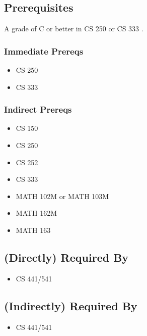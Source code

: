 \documentclass[]{article}
\providecommand{\tightlist}{%
  \setlength{\itemsep}{0pt}\setlength{\parskip}{0pt}}
\begin{document}
\subsection{Prerequisites}\label{prerequisites-23}

A grade of C or better in CS 250 or CS 333 .

\subsubsection{Immediate Prereqs}\label{immediate-prereqs-16}

\begin{itemize}
\tightlist
\item
  CS 250
\item
  CS 333
\end{itemize}

\subsubsection{Indirect Prereqs}\label{indirect-prereqs-16}

\begin{itemize}
\tightlist
\item
  CS 150
\item
  CS 250
\item
  CS 252
\item
  CS 333
\item
  MATH 102M or MATH 103M
\item
  MATH 162M
\item
  MATH 163
\end{itemize}

\subsection{(Directly) Required By}\label{directly-required-by-12}

\begin{itemize}
\tightlist
\item
  CS 441/541
\end{itemize}

\subsection{(Indirectly) Required By}\label{indirectly-required-by-12}

\begin{itemize}
\tightlist
\item
  CS 441/541
\end{itemize}
\end{document}

